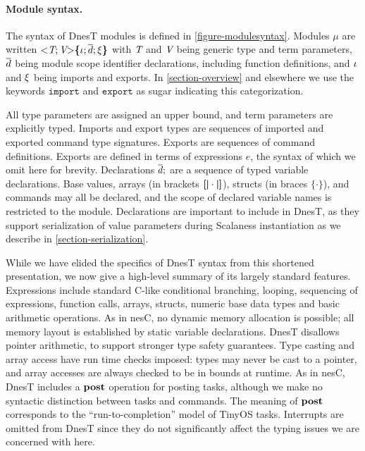 \modulesyntaxfig

\paragraph{Module syntax.} The syntax of DnesT modules is defined in
\autoref{figure-modulesyntax}. Modules $\mu$ are written $\mathrm{<}\textit{T}; \textit{V}\mathrm{>}\textup{\textbf{\{}} \iota;
\overline{d}; \xi \textup{\textbf{\}}} $ with $\textit{T}$ and $\textit{V}$ being generic type and term parameters,
$\overline{d}$ being module scope identifier declarations, including function definitions, and
$\iota$ and $\xi$ being imports and exports. In \autoref{section-overview} and elsewhere
we use the keywords $\texttt{import}$ and $\texttt{export}$ as sugar indicating this
categorization.

All type parameters are assigned an upper bound, and term parameters are explicitly typed.
Imports and export types are sequences of imported and exported command type signatures. Exports
are sequences of command definitions. Exports are defined in terms of expressions $e$, the
syntax of which we omit here for brevity. Declarations $\overline{d};$ are a sequence of typed variable
declarations. Base values, arrays (in brackets $\textup{\textbf{[}}\mskip -.5mu\textup{\textbf{|}}\, \!\cdot\! \,\textup{\textbf{|}}\mskip -.5 mu\textup{\textbf{]}}$), structs (in braces
$\{\cdot\}$), and commands may all be declared, and the scope of declared variable names is
restricted to the module. Declarations are important to include in DnesT, as they support
serialization of value parameters during Scalaness instantiation as we describe in
\autoref{section-serialization}.

While we have elided the specifics of DnesT syntax from this shortened presentation, we now give
a high-level summary of its largely standard features. Expressions include standard C-like
conditional branching, looping, sequencing of expressions, function calls, arrays, structs,
numeric base data types and basic arithmetic operations. As in nesC, no dynamic memory
allocation is possible; all memory layout is established by static variable declarations. DnesT
disallows pointer arithmetic, to support stronger type safety guarantees. Type casting and array
access have run time checks imposed: types may never be cast to a pointer, and array accesses
are always checked to be in bounds at runtime. As in nesC, DnesT includes a $\bf{post}$ operation
for posting tasks, although we make no syntactic distinction between tasks and commands. The
meaning of $\bf{post}$ corresponds to the ``run-to-completion'' model of TinyOS tasks. Interrupts
are omitted from DnesT since they do not significantly affect the typing issues we are concerned
with here.

